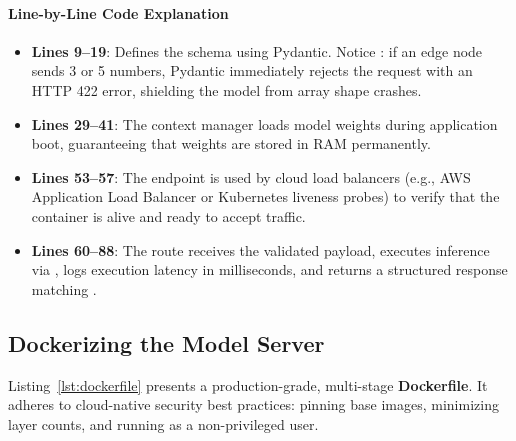 \paragraph{Line-by-Line Code Explanation}
\begin{itemize}
    \item \textbf{Lines 9--19}: Defines the  schema using Pydantic. Notice : if an edge node sends 3 or 5 numbers, Pydantic immediately rejects the request with an HTTP 422 error, shielding the model from array shape crashes.
    \item \textbf{Lines 29--41}: The  context manager loads model weights during application boot, guaranteeing that weights are stored in RAM permanently.
    \item \textbf{Lines 53--57}: The  endpoint is used by cloud load balancers (e.g., AWS Application Load Balancer or Kubernetes liveness probes) to verify that the container is alive and ready to accept traffic.
    \item \textbf{Lines 60--88}: The  route receives the validated payload, executes inference via , logs execution latency in milliseconds, and returns a structured response matching .
\end{itemize}

\subsection{Dockerizing the Model Server}\label{subsec:dockerfile}

Listing~\ref{lst:dockerfile} presents a production-grade, multi-stage \textbf{Dockerfile}. It adheres to cloud-native security best practices: pinning base images, minimizing layer counts, and running as a non-privileged user.

